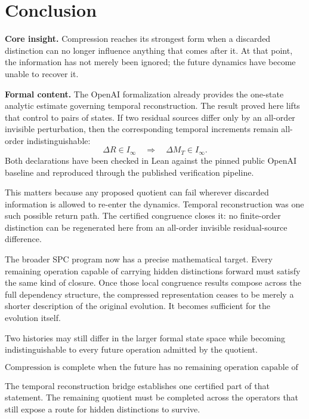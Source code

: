 \documentclass[11pt]{article}
\theoremstyle{highend}
\theoremstyle{definition}
\begin{document}
\section{Conclusion}
\begin{eurekabox}
\textbf{Core insight.} Compression reaches its strongest form when a discarded distinction can no longer influence anything that comes after it. At that point, the information has not merely been ignored; the future dynamics have become unable to recover it.
\end{eurekabox}

\noindent\textbf{Formal content.}
The OpenAI formalization already provides the one-state analytic estimate governing temporal reconstruction. The result proved here lifts that control to pairs of states. If two residual sources differ only by an all-order invisible perturbation, then the corresponding temporal increments remain all-order indistinguishable:
\[
\Delta R \in I_\infty
\quad\Longrightarrow\quad
\Delta M_T \in I_\infty.
\]
Both declarations have been checked in Lean against the pinned public OpenAI baseline and reproduced through the published verification pipeline.

This matters because any proposed quotient can fail wherever discarded information is allowed to re-enter the dynamics. Temporal reconstruction was one such possible return path. The certified congruence closes it: no finite-order distinction can be regenerated here from an all-order invisible residual-source difference.

The broader SPC program now has a precise mathematical target. Every remaining operation capable of carrying hidden distinctions forward must satisfy the same kind of closure. Once those local congruence results compose across the full dependency structure, the compressed representation ceases to be merely a shorter description of the original evolution. It becomes sufficient for the evolution itself.

Two histories may still differ in the larger formal state space while becoming indistinguishable to every future operation admitted by the quotient.

\[
\boxed{
\text{Compression is complete when the future has no remaining operation capable of recovering what was discarded.}
}
\]

The temporal reconstruction bridge establishes one certified part of that statement. The remaining quotient must be completed across the operators that still expose a route for hidden distinctions to survive.
\end{document}
